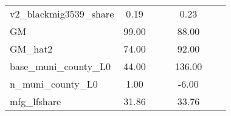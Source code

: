 \begin{table}[htbp]
\begin{tabular}{l*{2}{ccc}}
v2\_blackmig3539\_share&        0.19&            &            &        0.23&            &            \\
GM                  &       99.00&            &            &       88.00&            &            \\
GM\_hat2             &       74.00&            &            &       92.00&            &            \\
base\_muni\_county\_L0 &       44.00&            &            &      136.00&            &            \\
n\_muni\_county\_L0    &        1.00&            &            &       -6.00&            &            \\
mfg\_lfshare         &       31.86&            &            &       33.76&            &            \\
\bottomrule
\end{tabular}
\end{table}
